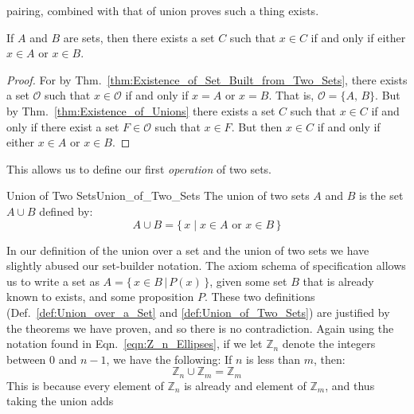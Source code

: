         pairing, combined with that of union proves
        such a thing exists.
        \begin{theorem}
            \label{thm:Union_of_Two_Sets_Exists}%
            If $A$ and $B$ are sets, then there exists a set $C$ such that
            $x\in{C}$ if and only if either $x\in{A}$ or $x\in{B}$.
        \end{theorem}
        \begin{proof}
            For by Thm.~\ref{thm:Existence_of_Set_Built_from_Two_Sets},
            there exists a set $\mathcal{O}$ such that $x\in\mathcal{O}$ if and
            only if $x=A$ or $x=B$. That is, $\mathcal{O}=\{A,\,B\}$.
            But by Thm.~\ref{thm:Existence_of_Unions} there exists a set
            $C$ such that $x\in{C}$ if and only if there exist a set
            $F\in\mathcal{O}$ such that $x\in{F}$. But then $x\in{C}$ if and
            only if either $x\in{A}$ or $x\in{B}$.
        \end{proof}
        This allows us to define our first \textit{operation} of two sets.
        \begin{fdefinition}{Union of Two Sets}{Union_of_Two_Sets}
            The \gls{union of two sets} $A$ and $B$ is the set $A\cup{B}$
            defined by:
            \begin{equation*}
                A\cup{B}=\big\{\,x\;|\;x\in{A}\textrm{ or }x\in{B}\,\big\}
            \end{equation*}
        \end{fdefinition}
        In our definition of the union over a set and the union of two sets
        we have slightly abused our set-builder notation. The axiom schema
        of specification allows us to write a set as
        $A=\{\,x\in{B}\,|\,P(x)\,\}$, given some set $B$ that is already known
        to exists, and some proposition $P$. These two definitions
        (Def.~\ref{def:Union_over_a_Set} and \ref{def:Union_of_Two_Sets})
        are justified by the theorems we have proven, and so there is no
        contradiction. Again using the notation found in
        Eqn.~\ref{eqn:Z_n_Ellipses}, if we let $\mathbb{Z}_{n}$ denote the
        integers between $0$ and $n-1$, we have the following: If $n$ is less
        than $m$, then:
        \begin{equation}
            \mathbb{Z}_{n}\cup\mathbb{Z}_{m}=\mathbb{Z}_{m}
        \end{equation}
        This is because every element of $\mathbb{Z}_{n}$ is already
        and element of $\mathbb{Z}_{m}$, and thus taking the union adds
